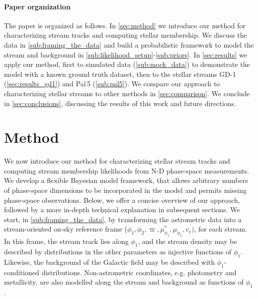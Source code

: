 \documentclass[twocolumn]{aastex631}
\newcommand{\stream}[1]{#1}
\newcommand{\parallax}{\varpi}
\begin{document}
    \paragraph{Paper organization}

        The paper is organized as follows.
        In \autoref{sec:method} we introduce our method for characterizing stream tracks and computing stellar membership.
        We discuss the data in \autoref{sub:framing_the_data} and build a probabilistic framework to model the stream and background in \autoref{sub:likelihood_setup}-\autoref{sub:priors}.
        In \autoref{sec:results} we apply our method,
        first to simulated data (\autoref{sub:mock_data}) to demonstrate the model with a known ground truth dataset,
        then to the stellar streams \stream{GD-1} (\autoref{sec:results_gd1}) and \stream{Pal\,5} (\autoref{sub:pal5}).
        We compare our approach to characterizing stellar streams to other methods in \autoref{sec:comparison}.
        We conclude in \autoref{sec:conclusions}, discussing the results of this work and future directions.


\section{Method} \label{sec:method}

    We now introduce our method for characterizing stellar stream tracks and computing stream membership likelihoods from N-D phase-space measurements.
    We develop a flexible Bayesian model framework, that allows arbitrary numbers of phase-space dimensions to be incorporated in the model and permits missing phase-space observations. 
    Below, we offer a concise overview of our approach, followed by a more in-depth technical explanation in subsequent sections.
    We start, in \autoref{sub:framing_the_data}, by transforming the astrometric data into
    a stream-oriented on-sky reference frame ($\phi_1, \phi_2, \parallax, \mu_{\phi_1}^*, \mu_{\phi_2}, v_r)$, for each stream. In this frame, 
    the stream track lies along $\phi_1$, and the stream density may be described by distributions in the other parameters as injective functions of $\phi_1$.
    Likewise, the background of the Galactic field may be described with $\phi_1$-conditioned distributions.
    Non-astrometric coordinates, e.g. photometry and metallicity, are also modelled along the stream and background as functions of $\phi_1$.
\end{document}
